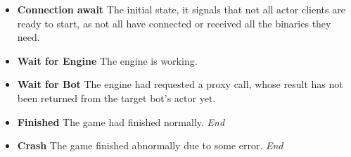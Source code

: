 		\begin{itemize}
			\item \textbf{Connection await} The initial state, it signals that not all actor clients are ready to start, as not all have connected or received all the binaries they need.
			
			\item \textbf{Wait for Engine} The engine is working.

			\item \textbf{Wait for Bot} The engine had requested a proxy call, whose result has not been returned from the target bot's actor yet.
			
			\item \textbf{Finished} The game had finished normally. \emph{End}
			
			\item \textbf{Crash} The game finished abnormally due to some error. \emph{End}
		\end{itemize}

